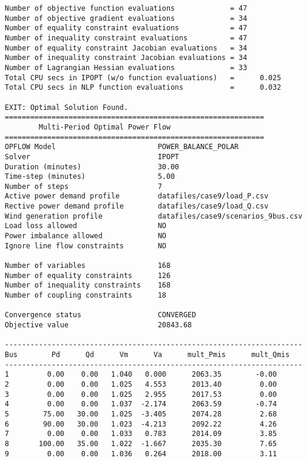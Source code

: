 \begin{lstlisting}
Number of objective function evaluations             = 47
Number of objective gradient evaluations             = 34
Number of equality constraint evaluations            = 47
Number of inequality constraint evaluations          = 47
Number of equality constraint Jacobian evaluations   = 34
Number of inequality constraint Jacobian evaluations = 34
Number of Lagrangian Hessian evaluations             = 33
Total CPU secs in IPOPT (w/o function evaluations)   =      0.025
Total CPU secs in NLP function evaluations           =      0.032

EXIT: Optimal Solution Found.
=============================================================
        Multi-Period Optimal Power Flow
=============================================================
OPFLOW Model                        POWER_BALANCE_POLAR
Solver                              IPOPT
Duration (minutes)                  30.00
Time-step (minutes)                 5.00
Number of steps                     7
Active power demand profile         datafiles/case9/load_P.csv
Rective power demand profile        datafiles/case9/load_Q.csv
Wind generation profile             datafiles/case9/scenarios_9bus.csv
Load loss allowed                   NO
Power imbalance allowed             NO
Ignore line flow constraints        NO

Number of variables                 168
Number of equality constraints      126
Number of inequality constraints    168
Number of coupling constraints      18

Convergence status                  CONVERGED
Objective value                     20843.68

----------------------------------------------------------------------
Bus        Pd      Qd      Vm      Va      mult_Pmis      mult_Qmis
----------------------------------------------------------------------
1         0.00    0.00   1.040   0.000      2063.35        -0.00
2         0.00    0.00   1.025   4.553      2013.40         0.00
3         0.00    0.00   1.025   2.955      2017.53         0.00
4         0.00    0.00   1.037  -2.174      2063.59        -0.74
5        75.00   30.00   1.025  -3.405      2074.28         2.68
6        90.00   30.00   1.023  -4.213      2092.22         4.26
7         0.00    0.00   1.033   0.783      2014.09         3.85
8       100.00   35.00   1.022  -1.667      2035.30         7.65
9         0.00    0.00   1.036   0.264      2018.00         3.11


\end{lstlisting}
